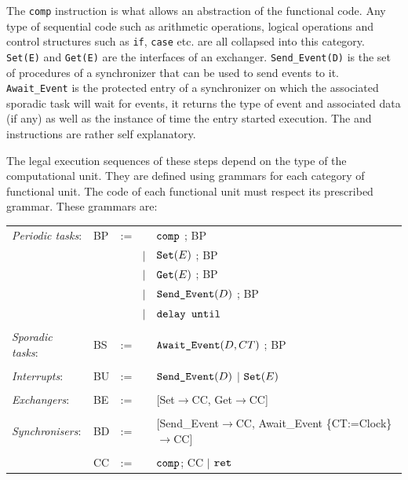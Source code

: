 The \texttt{comp} instruction is what allows an abstraction of the
functional code. Any type of sequential code such as arithmetic
operations, logical operations and control structures such as
\texttt{if}, \texttt{case} etc. are all collapsed into this
category. \texttt{Set(E)} and \texttt{Get(E)} are the interfaces of an
exchanger. \texttt{Send\_Event(D)} is the set of procedures of a
synchronizer that can be used to send events to
it. \texttt{Await\_Event} is the protected entry of a synchronizer on
which the associated sporadic task will wait for events, it returns
the type of event and associated data (if any) as well as the instance
of time the entry started execution. The  and
 instructions are rather self explanatory.

The legal execution sequences of these steps depend on the type 
of the computational unit. They are defined using grammars for each
category of functional unit. The code of each functional unit must
respect its prescribed grammar. These grammars are:\\

\begin{tabular}{llll}
\emph{Periodic tasks}: 
& BP & := & ${\text{\ttfamily comp}}$ ; BP \\
   & & \ \ \ \ $|$ & ${\text{\ttfamily Set}}(E)$ ; BP  \\
   & & \ \ \ \ $|$ & ${\text{\ttfamily Get}}(E)$ ; BP \\
   & & \ \ \ \ $|$ & ${\text{\ttfamily Send\_Event}}(D)$ ; BP \\
   & & \ \ \ \ $|$ & ${\text{\ttfamily delay until}}$ \\
\\
\emph{Sporadic tasks}: & BS &  := & ${\text{\ttfamily Await\_Event}}(D,
CT)$ ; BP\\ 
\\
\emph{Interrupts}: & BU & := & ${\text{\ttfamily Send\_Event}}(D)$
$|$ ${\text{\ttfamily Set}}(E)$\\
\\
\emph{Exchangers}: & BE &  := & [{\ttfamily Set}$\to$CC, {\ttfamily
  Get}$\to$CC]\\
\\
\emph{Synchronisers}: & BD & := & [{\ttfamily Send\_Event}$\to$CC, {\ttfamily Await\_Event} \{CT:=Clock\}$\to$CC] \\ 
\\
&CC &  := & ${\text{\ttfamily comp}}$; CC $|$ ${\text{\ttfamily ret}}$ \\
\end{tabular}\\

